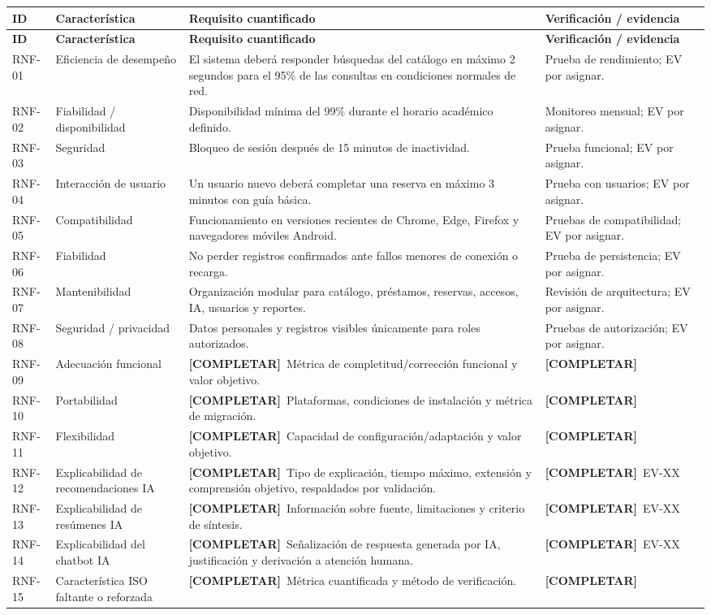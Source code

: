 \documentclass[12pt,journal,onecolumn]{IEEEtran}
\newcommand{\completar}{\textcolor{red!70!black}{\textbf{[COMPLETAR]}}}
\begin{document}
\begin{longtable}{P{0.10\textwidth}P{0.20\textwidth}P{0.48\textwidth}P{0.17\textwidth}}\toprule
\textbf{ID} & \textbf{Característica} & \textbf{Requisito cuantificado} & \textbf{Verificación / evidencia}\\\midrule\endfirsthead
\toprule\textbf{ID} & \textbf{Característica} & \textbf{Requisito cuantificado} & \textbf{Verificación / evidencia}\\\midrule\endhead
RNF-01 & Eficiencia de desempeño & El sistema deberá responder búsquedas del catálogo en máximo 2 segundos para el 95\% de las consultas en condiciones normales de red. & Prueba de rendimiento; EV por asignar.\\
RNF-02 & Fiabilidad / disponibilidad & Disponibilidad mínima del 99\% durante el horario académico definido. & Monitoreo mensual; EV por asignar.\\
RNF-03 & Seguridad & Bloqueo de sesión después de 15 minutos de inactividad. & Prueba funcional; EV por asignar.\\
RNF-04 & Interacción de usuario & Un usuario nuevo deberá completar una reserva en máximo 3 minutos con guía básica. & Prueba con usuarios; EV por asignar.\\
RNF-05 & Compatibilidad & Funcionamiento en versiones recientes de Chrome, Edge, Firefox y navegadores móviles Android. & Pruebas de compatibilidad; EV por asignar.\\
RNF-06 & Fiabilidad & No perder registros confirmados ante fallos menores de conexión o recarga. & Prueba de persistencia; EV por asignar.\\
RNF-07 & Mantenibilidad & Organización modular para catálogo, préstamos, reservas, accesos, IA, usuarios y reportes. & Revisión de arquitectura; EV por asignar.\\
RNF-08 & Seguridad / privacidad & Datos personales y registros visibles únicamente para roles autorizados. & Pruebas de autorización; EV por asignar.\\
RNF-09 & Adecuación funcional & \completar\ Métrica de completitud/corrección funcional y valor objetivo. & \completar\\
RNF-10 & Portabilidad & \completar\ Plataformas, condiciones de instalación y métrica de migración. & \completar\\
RNF-11 & Flexibilidad & \completar\ Capacidad de configuración/adaptación y valor objetivo. & \completar\\
RNF-12 & Explicabilidad de recomendaciones IA & \completar\ Tipo de explicación, tiempo máximo, extensión y comprensión objetivo, respaldados por validación. & \completar\ EV-XX\\
RNF-13 & Explicabilidad de resúmenes IA & \completar\ Información sobre fuente, limitaciones y criterio de síntesis. & \completar\ EV-XX\\
RNF-14 & Explicabilidad del chatbot IA & \completar\ Señalización de respuesta generada por IA, justificación y derivación a atención humana. & \completar\ EV-XX\\
RNF-15 & Característica ISO faltante o reforzada & \completar\ Métrica cuantificada y método de verificación. & \completar\\\bottomrule
\end{longtable}
\end{document}
